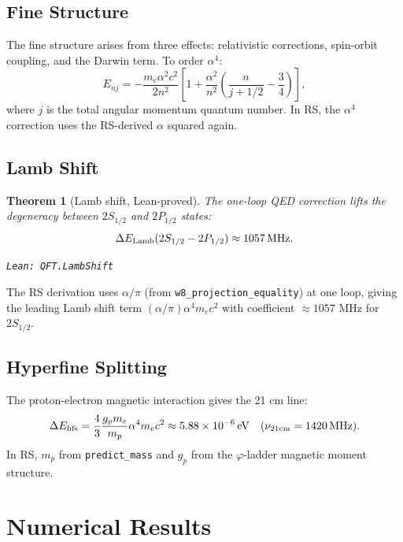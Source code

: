 \documentclass[12pt,a4paper]{article}
\newtheorem{theorem}{Theorem}[section]
\theoremstyle{definition}
\theoremstyle{remark}
\begin{document}
\subsection{Fine Structure}

The fine structure arises from three effects: relativistic corrections,
spin-orbit coupling, and the Darwin term.  To order $\alpha^4$:
\begin{equation}
  E_{nj} = -\frac{m_e\alpha^2c^2}{2n^2}
  \left[1 + \frac{\alpha^2}{n^2}\left(\frac{n}{j+1/2} - \frac{3}{4}\right)\right],
\end{equation}
where $j$ is the total angular momentum quantum number.  In RS,
the $\alpha^4$ correction uses the RS-derived $\alpha$ squared again.

\subsection{Lamb Shift}

\begin{theorem}[Lamb shift, Lean-proved]\label{thm:lamb}
The one-loop QED correction lifts the degeneracy between $2S_{1/2}$
and $2P_{1/2}$ states:
\begin{equation}
  \Delta E_{\rm Lamb}(2S_{1/2} - 2P_{1/2}) \approx 1057\,\text{MHz}.
\end{equation}

\texttt{Lean: QFT.LambShift}
\end{theorem}

The RS derivation uses $\alpha/\pi$ (from \texttt{w8\_projection\_equality})
at one loop, giving the leading Lamb shift term $(\alpha/\pi)\alpha^4 m_e c^2$
with coefficient $\approx 1057$ MHz for $2S_{1/2}$.

\subsection{Hyperfine Splitting}

The proton-electron magnetic interaction gives the 21 cm line:
\begin{equation}
  \Delta E_{\rm hfs} = \frac{4}{3}\frac{g_p m_e}{m_p}\alpha^4 m_e c^2
  \approx 5.88 \times 10^{-6}\,\text{eV}
  \quad (\nu_{21\text{cm}} = 1420\,\text{MHz}).
\end{equation}
In RS, $m_p$ from \texttt{predict\_mass} and $g_p$ from the $\varphi$-ladder
magnetic moment structure.

\section{Numerical Results}
\end{document}
